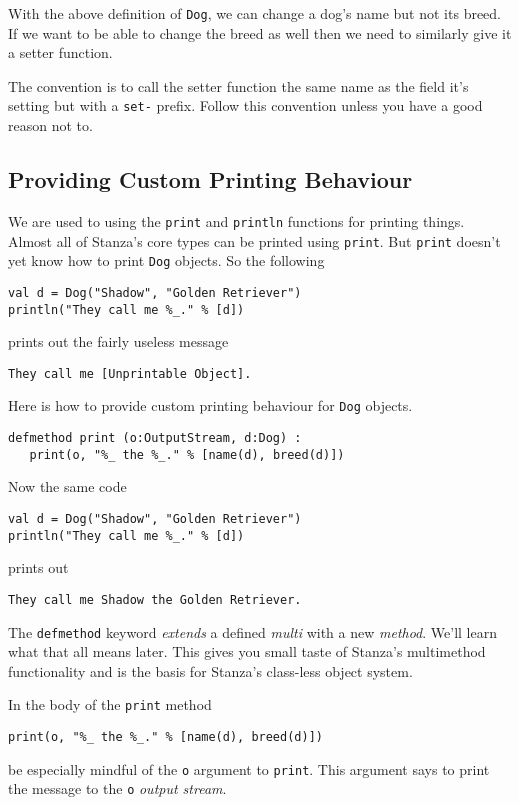 \documentclass[10pt,oneside]{book}
\begin{document}
With the above definition of \texttt{\frenchspacing Dog}, we can change a dog's name but not its breed. If we want to be able to change the breed as well then we need to similarly give it a setter function. 

The convention is to call the setter function the same name as the field it's setting but with a \texttt{\frenchspacing set-} prefix. Follow this convention unless you have a good reason not to.

\subsection*{Providing Custom Printing Behaviour}
We are used to using the \texttt{\frenchspacing print} and \texttt{\frenchspacing println} functions for printing things. Almost all of Stanza's core types can be printed using \texttt{\frenchspacing print}. But \texttt{\frenchspacing print} doesn't yet know how to print \texttt{\frenchspacing Dog} objects. So the following
\begin{lstlisting}
val d = Dog("Shadow", "Golden Retriever")
println("They call me %_." % [d])
\end{lstlisting}
prints out the fairly useless message
\begin{lstlisting}
They call me [Unprintable Object].
\end{lstlisting}

Here is how to provide custom printing behaviour for \texttt{\frenchspacing Dog} objects.
\begin{lstlisting}
defmethod print (o:OutputStream, d:Dog) :
   print(o, "%_ the %_." % [name(d), breed(d)])
\end{lstlisting}

Now the same code
\begin{lstlisting}
val d = Dog("Shadow", "Golden Retriever")
println("They call me %_." % [d])
\end{lstlisting}
prints out
\begin{lstlisting}
They call me Shadow the Golden Retriever.
\end{lstlisting}

The \texttt{\frenchspacing defmethod} keyword {\em extends} a defined {\em multi} with a new {\em method}. We'll learn what that all means later. This gives you small taste of Stanza's multimethod functionality and is the basis for Stanza's class-less object system. 

In the body of the \texttt{\frenchspacing print} method
\begin{lstlisting}
print(o, "%_ the %_." % [name(d), breed(d)])
\end{lstlisting}
be especially mindful of the \texttt{\frenchspacing o} argument to \texttt{\frenchspacing print}. This argument says to print the message to the \texttt{\frenchspacing o} {\em output stream}.
\end{document}
